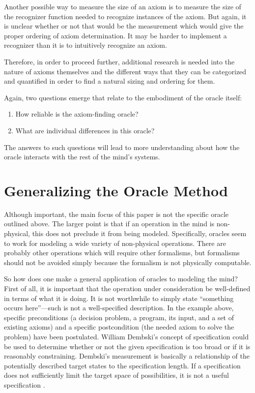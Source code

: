 Another possible way to measure the size of an axiom is to measure the size of the recognizer function needed to recognize instances of the axiom.  But again, it is unclear whether or not that would be the measurement which would give the proper ordering of axiom determination.  It may be harder to implement a recognizer than it is to intuitively recognize an axiom. 

Therefore, in order to proceed further, additional research is needed into the nature of axioms themselves and the different ways that they can be categorized and quantified in order to find a natural sizing and ordering for them.


Again, two questions emerge that relate to the embodiment of the oracle itself:

\begin{enumerate}
\item How reliable is the axiom-finding oracle?
\item What are individual differences in this oracle?
\end{enumerate}

The answers to such questions will lead to more understanding about how the oracle interacts with the rest of the mind's systems.

\section{Generalizing the Oracle Method}

Although important, the main focus of this paper is not the specific oracle outlined above.  The larger point is that if an operation in the mind is non-physical, this does not preclude it from being modeled.  Specifically, oracles seem to work for modeling a wide variety of non-physical operations.  There are probably other operations which will require other formalisms, but formalisms should not be avoided simply because the formalism is not physically computable.  

So how does one make a general application of oracles to modeling the mind?  First of all, it is important that the operation under consideration be well-defined in terms of what it is doing.  It is not worthwhile to simply state ``something occurs here''---such is not a well-specified description.  In the example above, specific preconditions (a decision problem, a program, its input, and a set of existing axioms) and a specific postcondition (the needed axiom to solve the problem) have been postulated.  William Dembski's concept of specification could be used to determine whether or not the given specification is too broad or if it is reasonably constraining.  Dembski's measurement is basically a relationship of the potentially described target states to the specification length.  If a specification does not sufficiently limit the target space of possibilities, it is not a useful specification \citep{dembski2005}.  

